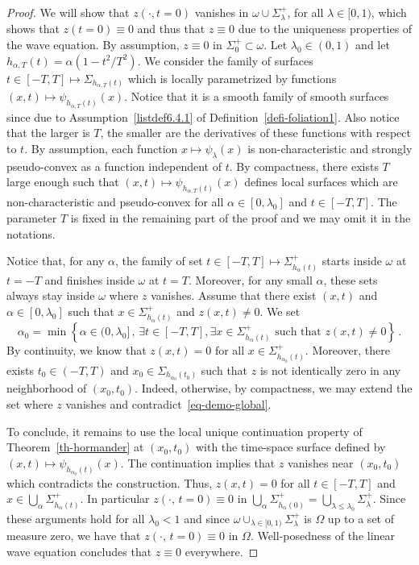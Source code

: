 \begin{proof}
We will show that $z(\cdot,t=0)$ vanishes in $\omega\cup\Sigma^+_\lambda$, for all $\lambda\in [0,1)$, which shows that $z(t=0)\equiv 0$ and thus that $z\equiv 0$ due to the uniqueness properties of the wave equation. By assumption, $z\equiv 0$ in $\Sigma_0^+\subset \omega$. Let $\lambda_0\in (0,1)$ and let $h_{\alpha,T}(t)=\alpha(1-t^2/T^2)$. We consider the family of surfaces $t\in [-T,T]\mapsto \Sigma_{h_{\alpha,T}(t)}$ which is locally parametrized by functions $(x,t)\mapsto \psi_{h_{\alpha,T}(t)}(x)$. Notice that it is a smooth family of smooth surfaces since due to Assumption~\eqref{listdef6.4.1} of Definition~\ref{defi-foliation1}. Also notice that the larger is $T$, the smaller are the derivatives of these functions with respect to $t$. By assumption, each function $x\mapsto \psi_\lambda(x)$ is non-characteristic and strongly pseudo-convex as a function independent of $t$. By compactness, there exists $T$ large enough such that $(x,t)\mapsto \psi_{h_{\alpha,T}(t)}(x)$ defines local surfaces which are non-characteristic and pseudo-convex for all $\alpha\in[0,\lambda_0]$ and $t\in[-T,T]$. The parameter $T$ is fixed in the remaining part of the proof and we may omit it in the notations.

Notice that, for any $\alpha$, the family of set $t\in[-T,T]\mapsto
\Sigma^+_{h_\alpha(t)}$ starts inside $\omega$ at $t=-T$ and finishes inside $\omega$ at $t=T$. Moreover, for any small $\alpha$, these sets always stay inside $\omega$ where $z$ vanishes. Assume that there exist $(x,t)$ and $\alpha\in[0,\lambda_0]$ such that $x\in
\Sigma^+_{h_\alpha(t)}$ and $z(x,t)\neq 0$. We set
\begin{equation}\label{eq-demo-global}
\alpha_0=\min\left\{\alpha\in (0,\lambda_0]\,,\,
\exists t\in[-T,T],\exists x\in\Sigma^+_{h_{\alpha}(t)}\text{ such that }z(x,t)\neq 0\right\}\,.
\end{equation}
By continuity, we know that $z(x,t)=0$ for all $x\in
\Sigma^+_{h_{\alpha_0}(t)}$. Moreover, there exists $t_0\in (-T,T)$ and $x_0\in\Sigma_{h_{\alpha_0}(t_0)}$ such that $z$ is not identically zero in any neighborhood of $(x_0,t_0)$. Indeed, otherwise, by compactness, we may extend the set where $z$ vanishes and contradict~\eqref{eq-demo-global}.

To conclude, it remains to use the local unique continuation property of Theorem~\ref{th-hormander} at $(x_0,t_0)$ with the time-space surface defined by $(x,t)\mapsto \psi_{h_{\alpha_0}(t)}(x)$. The continuation implies that $z$ vanishes near $(x_0,t_0)$ which contradicts the construction. Thus, $z(x,t)=0$ for all $t\in [-T,T]$ and $x\in \bigcup_\alpha \Sigma^+_{h_\alpha(t)}$. In particular $z(\cdot,\,t=0)\equiv 0$ in $\bigcup_{\alpha}\Sigma^+_{h_\alpha(0)}=\bigcup_{\lambda\leq\lambda_0}
\Sigma^+_\lambda$. Since these arguments hold for all $\lambda_0<1$ and since $\omega\cup_{\lambda\in [0,1)} \Sigma^+_\lambda$ is $\Omega$ up to a set of measure zero, we have that $z(\cdot,\,t=0)\equiv 0$ in $\Omega$. Well-posedness of the linear wave equation concludes that $z\equiv 0$ everywhere.
\end{proof}


